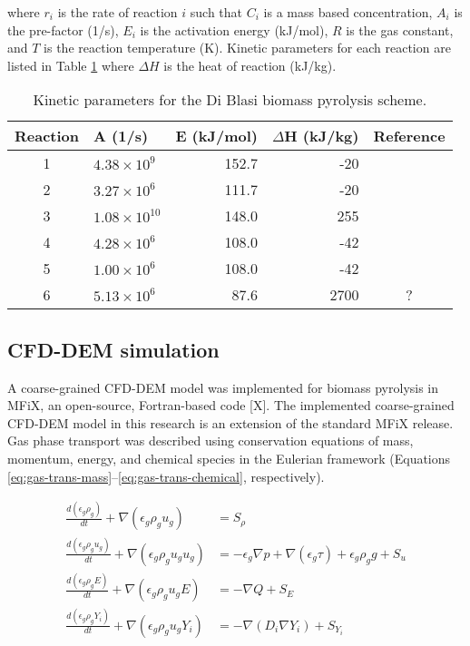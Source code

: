 \noindent where $r_i$ is the rate of reaction $i$ such that $C_i$ is a mass based concentration, $A_i$ is the pre-factor (1/s), $E_i$ is the activation energy (kJ/mol), $R$ is the gas constant, and $T$ is the reaction temperature (K). Kinetic parameters for each reaction are listed in Table \ref{tab:kinetic-params} where $\Delta H$ is the heat of reaction (kJ/kg).

\begin{table}[H]
    \centering
    \caption{Kinetic parameters for the Di Blasi biomass pyrolysis scheme.}
    \begin{tabular}{clrrc}
        \toprule
        Reaction    & A (1/s)               & E (kJ/mol) & $\Delta$H (kJ/kg) & Reference \\
        \midrule
        1           & $4.38 \times 10^9$    & 152.7      & -20               & \cite{Blasi-2001} \\
        2           & $3.27 \times 10^6$    & 111.7      & -20               & \cite{Blasi-2001} \\
        3           & $1.08 \times 10^{10}$ & 148.0      & 255               & \cite{Blasi-2001} \\
        4           & $4.28 \times 10^6$    & 108.0      & -42               & \cite{Blasi-1993} \\
        5           & $1.00 \times 10^6$    & 108.0      & -42               & \cite{Blasi-1993} \\
        6           & $5.13 \times 10^6$    & 87.6       & 2700              & ? \\
        \bottomrule
    \end{tabular}
    \label{tab:kinetic-params}
\end{table}

\subsection{CFD-DEM simulation}

A coarse-grained CFD-DEM model was implemented for biomass pyrolysis in MFiX, an open-source, Fortran-based code [X]. The implemented coarse-grained CFD-DEM model in this research is an extension of the standard MFiX release. Gas phase transport was described using conservation equations of mass, momentum, energy, and chemical species in the Eulerian framework (Equations \ref{eq:gas-trans-mass}--\ref{eq:gas-trans-chemical}, respectively).

\begin{align}
    \frac{d(\epsilon_g \rho_g)}{dt} + \nabla (\epsilon_g \rho_g u_g) &= S_\rho \label{eq:gas-trans-mass} \\
    \frac{d(\epsilon_g \rho_g u_g)}{dt} + \nabla (\epsilon_g \rho_g u_g u_g) &= -\epsilon_g \nabla p + \nabla (\epsilon_g \tau) + \epsilon_g \rho_g g + S_u \\
    \frac{d(\epsilon_g \rho_g E)}{dt} + \nabla (\epsilon_g \rho_g u_g E) &= -\nabla Q + S_E \\
    \frac{d(\epsilon_g \rho_g Y_i)}{dt} + \nabla (\epsilon_g \rho_g u_g Y_i) &= -\nabla (D_i \nabla Y_i) + S_{Y_i} \label{eq:gas-trans-chemical}
\end{align}

